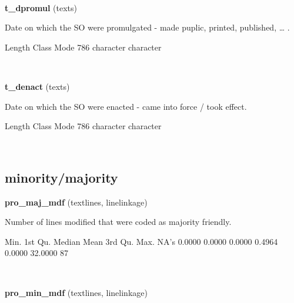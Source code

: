 \documentclass[]{article}
\newenvironment{Shaded}{\begin{snugshade}}{\end{snugshade}}
\newcommand{\DecValTok}[1]{\textcolor[rgb]{0.00,0.00,0.81}{{#1}}}
\newcommand{\StringTok}[1]{\textcolor[rgb]{0.31,0.60,0.02}{{#1}}}
\newcommand{\NormalTok}[1]{{#1}}
\begin{document}
~

\vspace{1em}

\textbf{t\_dpromul} (texts)

Date on which the SO were promulgated - made puplic, printed, published,
\ldots{} .

\begin{Shaded}
\begin{Highlighting}[]
   \NormalTok{Length     Class      Mode }
      \DecValTok{786} \NormalTok{character character }
\end{Highlighting}
\end{Shaded}

~

\vspace{1em}

\textbf{t\_denact} (texts)

Date on which the SO were enacted - came into force / took effect.

\begin{Shaded}
\begin{Highlighting}[]
   \NormalTok{Length     Class      Mode }
      \DecValTok{786} \NormalTok{character character }
\end{Highlighting}
\end{Shaded}

~

\vspace{1em}

\subsection{minority/majority}\label{minoritymajority}

\textbf{pro\_maj\_mdf} (textlines, linelinkage)

Number of lines modified that were coded as majority friendly.

\begin{Shaded}
\begin{Highlighting}[]
   \NormalTok{Min. 1st Qu.  Median    Mean 3rd Qu.    Max.    NA}\StringTok{'s }
\StringTok{ 0.0000  0.0000  0.0000  0.4964  0.0000 32.0000      87 }
\end{Highlighting}
\end{Shaded}

~

\vspace{1em}

\textbf{pro\_min\_mdf} (textlines, linelinkage)
\end{document}
